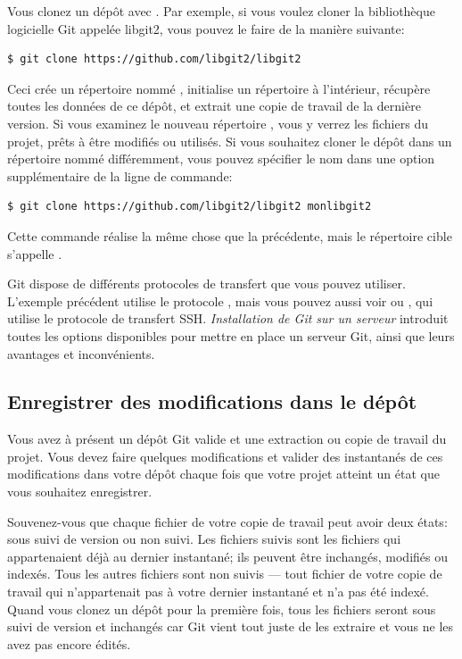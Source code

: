 Vous clonez un dépôt avec .
Par exemple, si vous voulez cloner la bibliothèque logicielle Git appelée libgit2, vous pouvez le faire de la manière suivante:
\begin{Schunk}
\begin{Verbatim}
$ git clone https://github.com/libgit2/libgit2
\end{Verbatim}
\end{Schunk}

Ceci crée un répertoire nommé , initialise un répertoire  à l'intérieur, récupère toutes les données de ce dépôt, et extrait une copie de travail de la dernière version.
Si vous examinez le nouveau répertoire , vous y verrez les fichiers du projet, prêts à être modifiés ou utilisés.
Si vous souhaitez cloner le dépôt dans un répertoire nommé différemment, vous pouvez spécifier le nom dans une option supplémentaire de la ligne de commande:
\begin{Schunk}
\begin{Verbatim}
$ git clone https://github.com/libgit2/libgit2 monlibgit2
\end{Verbatim}
\end{Schunk}

Cette commande réalise la même chose que la précédente, mais le répertoire cible s'appelle .

Git dispose de différents protocoles de transfert que vous pouvez utiliser.
L'exemple précédent utilise le protocole , mais vous pouvez aussi voir  ou , qui utilise le protocole de transfert SSH.
\emph{Installation de Git sur un serveur} introduit toutes les options disponibles pour mettre en place un serveur Git, ainsi que leurs avantages et inconvénients.

\subsection{Enregistrer des modifications dans le dépôt}

Vous avez à présent un dépôt Git valide et une extraction ou copie de travail du projet.
Vous devez faire quelques modifications et valider des instantanés de ces modifications dans votre dépôt chaque fois que votre projet atteint un état que vous souhaitez enregistrer.

Souvenez-vous que chaque fichier de votre copie de travail peut avoir deux états: sous suivi de version ou non suivi.
Les fichiers suivis sont les fichiers qui appartenaient déjà au dernier instantané; ils peuvent être inchangés, modifiés ou indexés.
Tous les autres fichiers sont non suivis --- tout fichier de votre copie de travail qui n'appartenait pas à votre dernier instantané et n'a pas été indexé.
Quand vous clonez un dépôt pour la première fois, tous les fichiers seront sous suivi de version et inchangés car Git vient tout juste de les extraire et vous ne les avez pas encore édités.

